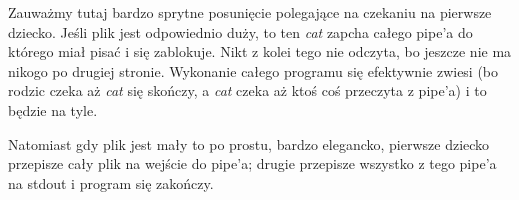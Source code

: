 Zauważmy tutaj bardzo sprytne posunięcie polegające na czekaniu na pierwsze dziecko. Jeśli plik jest odpowiednio duży, to ten \textit{cat} zapcha całego pipe'a do którego miał pisać i się zablokuje. Nikt z kolei tego nie odczyta, bo jeszcze nie ma nikogo po drugiej stronie. Wykonanie całego programu się efektywnie zwiesi (bo rodzic czeka aż \textit{cat} się skończy, a \textit{cat} czeka aż ktoś coś przeczyta z pipe'a) i to będzie na tyle.

Natomiast gdy plik jest mały to po prostu, bardzo elegancko, pierwsze dziecko przepisze cały plik na wejście do pipe'a; drugie przepisze wszystko z tego pipe'a na stdout i program się zakończy.